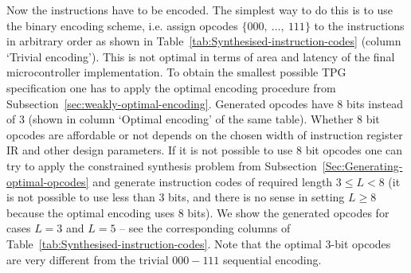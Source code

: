 Now the instructions have to be encoded. The simplest way to do this
is to use the binary encoding scheme, i.e. assign opcodes $\{000,\ \dots,\ 111\}$
to the instructions in arbitrary order as shown in Table~\ref{tab:Synthesised-instruction-codes}
(column `Trivial encoding'). This is not optimal in terms of area
and latency of the final microcontroller implementation. To obtain
the smallest possible TPG specification one has to apply the optimal
encoding procedure from Subsection~\ref{sec:weakly-optimal-encoding}. Generated
opcodes have 8 bits instead of 3 (shown in column `Optimal encoding'
of the same table). Whether 8 bit opcodes are affordable or not depends
on the chosen width of instruction register IR and other design parameters.
If it is not possible to use 8 bit opcodes one can try to apply the
constrained synthesis problem from Subsection~\ref{Sec:Generating-optimal-opcodes}
and generate instruction codes of required length $3\le L<8$ (it
is not possible to use less than 3 bits, and there is no sense in
setting $L\ge8$ because the optimal encoding uses 8 bits). We show
the generated opcodes for cases $L=3$ and $L=5$ -- see the corresponding
columns of Table~\ref{tab:Synthesised-instruction-codes}. Note that
the optimal 3-bit opcodes are very different from the trivial $000-111$
sequential encoding.


